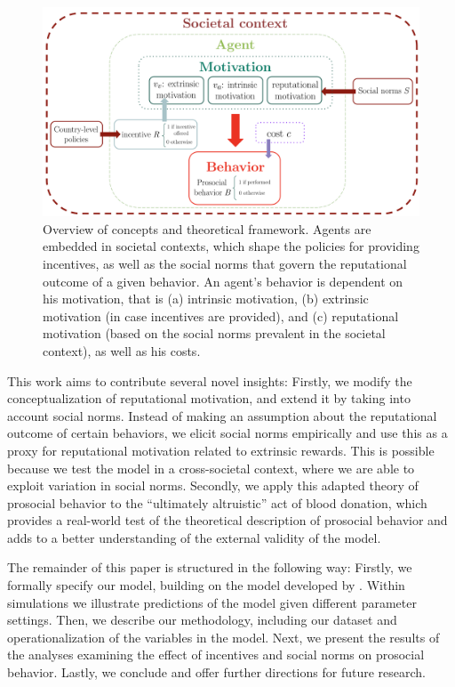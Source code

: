 \documentclass[AER]{AEA}
\begin{document}
\begin{figure}[t!]
    \centering
    \includegraphics[width=\textwidth]{images/overview.png}
    \caption{Overview of concepts and theoretical framework. Agents are embedded in societal contexts, which shape the policies for providing incentives, as well as the social norms that govern the reputational outcome of a given behavior. An agent’s behavior is dependent on his motivation, that is (a) intrinsic motivation, (b) extrinsic motivation (in case incentives are provided), and (c) reputational motivation (based on the social norms prevalent in the societal context), as well as his costs.}
    \label{fig:overview}
\end{figure}



This work aims to contribute several novel insights: Firstly, we modify the conceptualization of reputational motivation, and extend it by taking into account social norms. Instead of making an assumption about the reputational outcome of certain behaviors, we elicit social norms empirically and use this as a proxy for reputational motivation related to extrinsic rewards. This is possible because we test the model in a cross-societal context, where we are able to exploit variation in social norms. Secondly, we apply this adapted theory of prosocial behavior to the “ultimately altruistic” act of blood donation, which provides a real-world test of the theoretical description of prosocial behavior and adds to a better understanding of the external validity of the model.

The remainder of this paper is structured in the following way: Firstly, we formally specify our model, building on the model developed by \cite{benabou_incentives_2006}. Within simulations we illustrate predictions of the model given different parameter settings. Then, we describe our methodology, including our dataset and operationalization of the variables in the model. Next, we present the results of the analyses examining the effect of incentives and social norms on prosocial behavior. Lastly, we conclude and offer further directions for future research.
\end{document}
